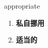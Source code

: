 
\begin{frame}
{\huge appropriate}
\begin{center}
\begin{enumerate}\Large
  \item \textbf{私自挪用}
  \item \textbf{适当的}
\end{enumerate}
\end{center}
\end{frame}
